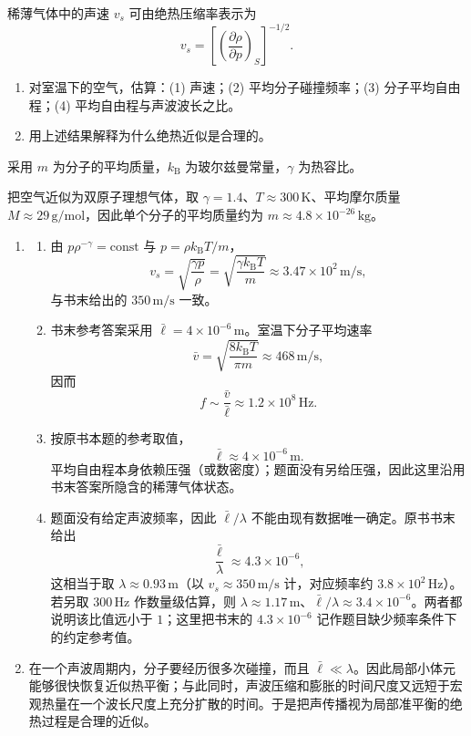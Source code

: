 \begin{exercise}\label{ex:13.5}
稀薄气体中的声速 $v_s$ 可由绝热压缩率表示为
\[
 v_s=\left[\left(\frac{\partial\rho}{\partial p}\right)_S\right]^{-1/2}.
\]
\begin{enumerate}
  \item[(a)] 对室温下的空气，估算：(1) 声速；(2) 平均分子碰撞频率；(3) 分子平均自由程；(4) 平均自由程与声波波长之比。
  \item[(b)] 用上述结果解释为什么绝热近似是合理的。
\end{enumerate}
采用 $m$ 为分子的平均质量，$k_{\mathrm B}$ 为玻尔兹曼常量，$\gamma$ 为热容比。
\end{exercise}
\begin{solution}
把空气近似为双原子理想气体，取 $\gamma=1.4$、$T\approx300\,\mathrm K$、平均摩尔质量 $M\approx29\,\mathrm{g/mol}$，因此单个分子的平均质量约为 $m\approx4.8\times10^{-26}\,\mathrm{kg}$。

\begin{enumerate}
  \item[(a)]
  \begin{enumerate}
    \item[(1)] 由 $p\rho^{-\gamma}=\mathrm{const}$ 与 $p=\rho k_{\mathrm B}T/m$，
    \[
      v_s=\sqrt{\frac{\gamma p}{\rho}}
          =\sqrt{\frac{\gamma k_{\mathrm B}T}{m}}
          \approx3.47\times10^2\,\mathrm{m/s},
    \]
    与书末给出的 $350\,\mathrm{m/s}$ 一致。

    \item[(2)] 书末参考答案采用 $\bar\ell=4\times10^{-6}\,\mathrm m$。室温下分子平均速率
    \[
      \bar v=\sqrt{\frac{8k_{\mathrm B}T}{\pi m}}\approx468\,\mathrm{m/s},
    \]
    因而
    \[
      f\sim\frac{\bar v}{\bar\ell}
       \approx1.2\times10^8\,\mathrm{Hz}.
    \]

    \item[(3)] 按原书本题的参考取值，
    \[
      \bar\ell\approx4\times10^{-6}\,\mathrm m.
    \]
    平均自由程本身依赖压强（或数密度）；题面没有另给压强，因此这里沿用书末答案所隐含的稀薄气体状态。

    \item[(4)] 题面没有给定声波频率，因此 $\bar\ell/\lambda$ 不能由现有数据唯一确定。原书书末给出
    \[
      \frac{\bar\ell}{\lambda}\approx4.3\times10^{-6},
    \]
    这相当于取 $\lambda\approx0.93\,\mathrm m$（以 $v_s\approx350\,\mathrm{m/s}$ 计，对应频率约 $3.8\times10^2\,\mathrm{Hz}$）。若另取 $300\,\mathrm{Hz}$ 作数量级估算，则 $\lambda\approx1.17\,\mathrm m$、$\bar\ell/\lambda\approx3.4\times10^{-6}$。两者都说明该比值远小于 $1$；这里把书末的 $4.3\times10^{-6}$ 记作题目缺少频率条件下的约定参考值。
  \end{enumerate}

  \item[(b)] 在一个声波周期内，分子要经历很多次碰撞，而且 $\bar\ell\ll\lambda$。因此局部小体元能够很快恢复近似热平衡；与此同时，声波压缩和膨胀的时间尺度又远短于宏观热量在一个波长尺度上充分扩散的时间。于是把声传播视为局部准平衡的绝热过程是合理的近似。
\end{enumerate}
\end{solution}

